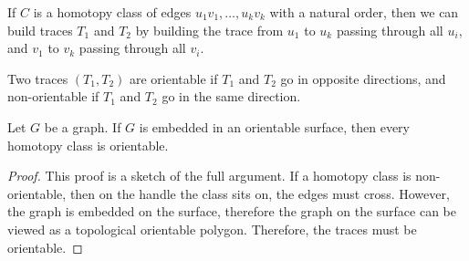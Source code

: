 \begin{claim}
	If \(C\) is a homotopy class of edges \(u_1 v_1, \ldots, u_k v_k\) with a natural order, then we can build traces \(T_1\) and \(T_2\) by building the trace from \(u_1\) to \(u_k\) passing through all \(u_i\), and \(v_1\) to \(v_k\) passing through all \(v_i\).
\end{claim}
Two traces $(T_1, T_2)$ are orientable if \(T_1\) and \(T_2\) go in opposite directions, and non-orientable if \(T_1\) and \(T_2\) go in the same direction.

\begin{lemma}
	Let $G$ be a graph. If \(G\) is embedded in an orientable surface, then every homotopy class is orientable.
\end{lemma}
\begin{proof}
	This proof is a sketch of the full argument. If a homotopy class is non-orientable, then on the handle the class sits on, the edges must cross. However, the graph is embedded on the surface, therefore the graph on the surface can be viewed as a topological orientable polygon. Therefore, the traces must be orientable.
\end{proof}

